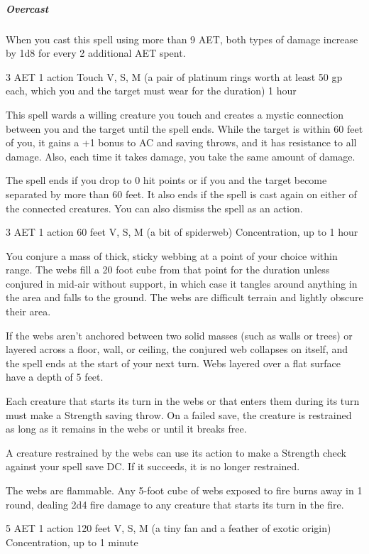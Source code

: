 \subparagraph*{Overcast} When you cast this spell using more than 9 AET, both types of damage increase by 1d8 for every 2 additional AET spent.


{3 AET}
{1 action}
{Touch}
{V, S, M (a pair of platinum rings worth at least 50 gp each, which you and the target must wear for the duration)}
{1 hour}

This spell wards a willing creature you touch and creates a mystic connection between you and the target until the spell ends. While the target is within 60 feet of you, it gains a +1 bonus to AC and saving throws, and it has resistance to all damage. Also, each time it takes damage, you take the same amount of damage.

The spell ends if you drop to 0 hit points or if you and the target become separated by more than 60 feet. It also ends if the spell is cast again on either of the connected creatures. You can also dismiss the spell as an action.


{3 AET}
{1 action}
{60 feet}
{V, S, M (a bit of spiderweb)}
{Concentration, up to 1 hour}

You conjure a mass of thick, sticky webbing at a point of your choice within range. The webs fill a 20 foot cube from that point for the duration unless conjured in mid-air without support, in which case it tangles around anything in the area and falls to the ground. The webs are difficult terrain and lightly obscure their area.

If the webs aren't anchored between two solid masses (such as walls or trees) or layered across a floor, wall, or ceiling, the conjured web collapses on itself, and the spell ends at the start of your next turn. Webs layered over a flat surface have a depth of 5 feet.

Each creature that starts its turn in the webs or that enters them during its turn must make a Strength saving throw. On a failed save, the creature is restrained as long as it remains in the webs or until it breaks free.

A creature restrained by the webs can use its action to make a Strength check against your spell save DC. If it succeeds, it is no longer restrained.

The webs are flammable. Any 5-foot cube of webs exposed to fire burns away in 1 round, dealing 2d4 fire damage to any creature that starts its turn in the fire.


{5 AET}
{1 action}
{120 feet}
{V, S, M (a tiny fan and a feather of exotic origin)}
{Concentration, up to 1 minute}

